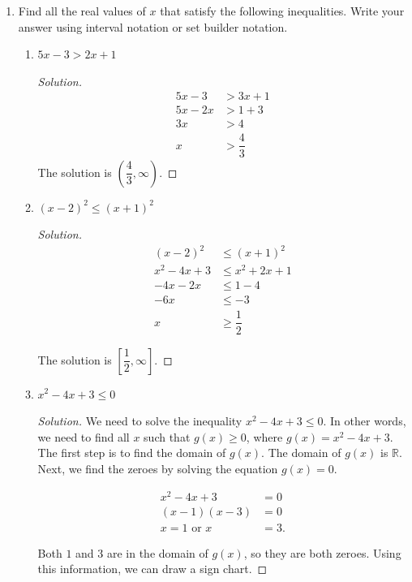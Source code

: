 \documentclass[12pt]{article}
\newenvironment{solution}{\begin{proof}[Solution]}{\end{proof}}
\begin{document}
	\begin{enumerate}
		\item Find all the real values of $x$ that satisfy the following inequalities. Write your answer using interval notation or set builder notation.
		\begin{enumerate}
			\item $5x-3>2x+1$
			\begin{solution}
				\begin{align*}
					5x-3&>3x+1\\
					5x-2x&>1+3\\
					3x&>4\\
					x&>\dfrac{4}{3}
				\end{align*} 
				The solution is $\left(\dfrac{4}{3},\infty\right)$.
			\end{solution}
			\item $(x-2)^2\leq (x+1)^2$
							
				\begin{solution}
					\begin{align*}
						(x-2)^2&\leq (x+1)^2\\
						x^2-4x+3 &\leq x^2+2x+1\\
						-4x-2x&\leq 1-4\\
						-6x &\leq -3\\
						x &\geq \dfrac{1}{2}
					\end{align*}
					
					The solution is $\left[\dfrac{1}{2},\infty\right]$.
				\end{solution}
			\item $x^2-4x+3\leq 0$
			
			
			
			\begin{solution}
				We need to solve the inequality $x^2-4x+3\leq 0$. In other words, we need to find all $x$ such that $g(x) \geq 0$, where $g(x)=x^2-4x+3$. The first step is to find the domain of $g(x)$. The domain of $g(x)$ is $\mathbb{R}$. Next, we find the zeroes by solving the equation $g(x)=0$.
				
				\begin{align*}
					x^2-4x+3&=0\\
					(x-1)(x-3)&=0\\
					x=1 \text{ or } x&=3.
				\end{align*}
				
				Both $1$ and $3$ are in the domain of $g(x)$, so they are both zeroes. Using this information, we can draw a sign chart. 
				

\end{solution}
\end{enumerate}
\end{enumerate}
\end{document}
